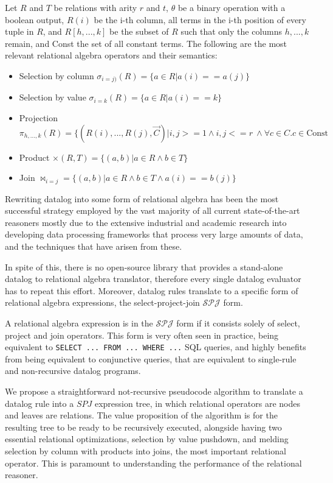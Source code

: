 \documentclass[manuscript,screen,review]{acmart}
\theoremstyle{definition}
\begin{document}
Let $R$ and $T$ be relations with arity $r$ and $t$, $\theta$ be a binary operation with a boolean output, $R(i)$ be the i-th column, all terms in the i-th position of every tuple in $R$, and
$R[h, ..., k]$ be the subset of $R$ such that only the columns $h, ..., k$ remain, and Const the set of all constant terms. The following
are the most relevant relational algebra operators and their semantics:
\begin{itemize}
	\item Selection by column $\sigma_{i=j)}(R) = \{ a \in R | a(i) == a(j) \}$
	\item Selection by value $\sigma_{i=k}(R) = \{a \in R | a(i) == k \}$
	\item Projection $\pi_{h, ..., k}(R) = \{(R(i), ..., R(j), \overrightarrow{C}) |  i, j >= 1 \wedge i, j <= r\ \wedge \forall c \in C. c \in \text{Const}$
	\item Product $\times(R, T) = \{(a, b) | a \in R \wedge b \in T \}$
	\item Join $\Join_{i=j} = \{(a, b) | a \in R \wedge b \in T \wedge a(i) == b(j)\}$
\end{itemize}

Rewriting datalog into some form of relational algebra has been the most successful strategy employed by the vast majority of all current state-of-the-art
reasoners\cite{bigdatalog, cog, nexus, recstep, dcdatalog, souffle} mostly due to the extensive industrial and academic research into developing data processing frameworks that
process very large amounts of data, and the techniques that have arisen from these.

In spite of this, there is no open-source library that provides a stand-alone datalog to relational algebra translator, therefore every single
datalog evaluator has to repeat this effort. Moreover, datalog rules translate to a specific form of relational algebra expressions, the
select-project-join $\mathcal{SPJ}$ form.

A relational algebra expression is in the $\mathcal{SPJ}$ form if it consists solely of select, project and join operators. This form
is very often seen in practice, being equivalent to \verb|SELECT ... FROM ... WHERE ...| SQL queries, and highly benefits from being
equivalent to conjunctive queries, that are equivalent to single-rule and non-recursive datalog programs.

We propose a straightforward not-recursive pseudocode algorithm to translate a datalog rule into a $SPJ$ expression tree, in which
relational operators are nodes and leaves are relations. The value proposition of the algorithm is for the resulting tree to be ready
to be recursively executed, alongside having two essential relational optimizations, selection by value pushdown, and melding selection
by column with products into joins, the most important relational operator. This is paramount to understanding the performance of the relational reasoner.
\end{document}
